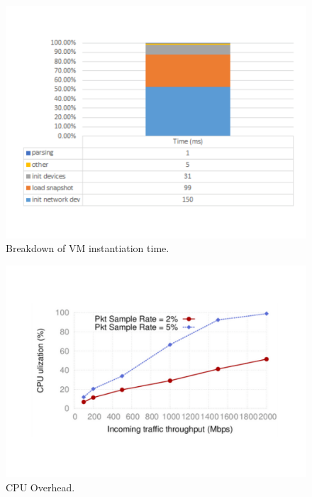 \begin{figure}[t!]
 \centering
\includegraphics[width=\linewidth]{figs/instantiation.pdf}
\vspace{-0.32in}
\caption{\small Breakdown of VM instantiation time.}
\vspace{-0.0in}
\label{fig:break}
\end{figure}




\begin{figure}[t!]
 \centering
\includegraphics[width=\linewidth]{figs/CPU.pdf}
\vspace{-0.32in}
\caption{\small CPU Overhead.}
\vspace{-0.0in}
\label{fig:overhead}
\end{figure}

